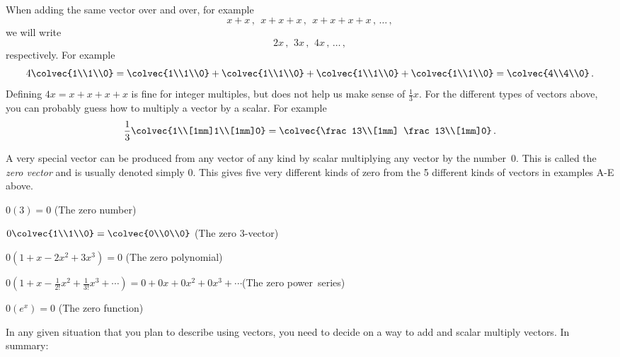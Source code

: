 When adding the same vector over and over, for example
$$
x+x\, ,\: \  x+x+x\, ,\:\    x+x+x+x\,  ,\, \ldots\, ,
$$
we will write
$$
2x\, ,\: \, 3x\, , \:\,  4x\, ,\, \ldots\, ,
$$
respectively. For example
$$
4\colvec{1\\1\\0}=\colvec{1\\1\\0}+\colvec{1\\1\\0}+\colvec{1\\1\\0}+\colvec{1\\1\\0}=\colvec{4\\4\\0}\, .
$$
Defining $4x=x+x+x+x$ is fine for integer multiples, but does not help us make sense of $\frac13 x$. For the different types of vectors 
above, you can probably guess how to multiply a vector by a scalar. For example
$$
\frac 13 \colvec{1\\[1mm]1\\[1mm]0} = \colvec{\frac13\\[1mm] \frac13\\[1mm]0}\, .
$$

 A very special vector can be produced from any vector of any kind by scalar multiplying any vector by the number~$0$. 
This is called the {\it zero vector} and is usually denoted simply $0$. This gives five very different kinds of zero from the 5 different kinds of vectors in   examples A-E above.
\begin{enumext}[label=\Alph*,wrap-label=(#1)]
\item $0(3)=0$ (The zero number)
\item $0\colvec{1\\1\\0}=\colvec{0\\0\\0} $ (The zero 3-vector)
\item $0\left(1+x-2x^2+3x^3\right)=0$ (The zero polynomial)
\item 
$0\!\left(  1+x\!-\!\frac1{2!}x^2\!+\!\frac1{3!}x^3\!+\cdots \!\right) \!
 =  0+0x+0x^2\!+0x^3\!+\cdots $(The zero power~series)
 \item $0\left(   e^x \right) =0$ (The zero function)
\end{enumext}

In any given situation that you plan to describe using vectors, you need to decide on a way to add and scalar multiply vectors.
In summary:
\vspace{3mm}
\begin{center}
\end{center}
\vspace{3mm}

